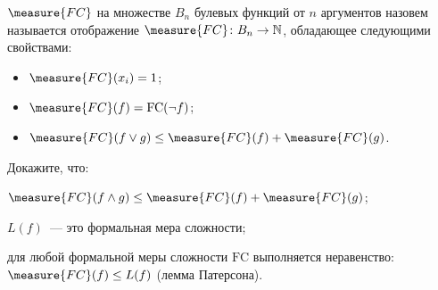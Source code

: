  $\measure{FC}$ на множестве $B_n$ булевых функций от $n$ аргументов
назовем называется отображение $\measure{FC}\colon B_n \to \mathbb{N}$, обладающее следующими свойствами:
\begin{itemize}
    \item $\measure{FC}(x_i) = 1$;
    \item $\measure{FC}(f) = \mathrm{FC}(\neg f)$;
    \item $\measure{FC}(f \lor g) \le \measure{FC}(f) + \measure{FC}(g)$.
\end{itemize}

Докажите, что:
\begin{enumcyr}
    \item $\measure{FC}(f \land g) \le \measure{FC}(f) + \measure{FC}(g)$;
    \item $L(f)$~--- это формальная мера сложности;
    \item для любой формальной меры сложности $\mathrm{FC}$ выполняется неравенство: $\measure{FC}(f) \le
        L(f)$ (лемма Патерсона).
\end{enumcyr}